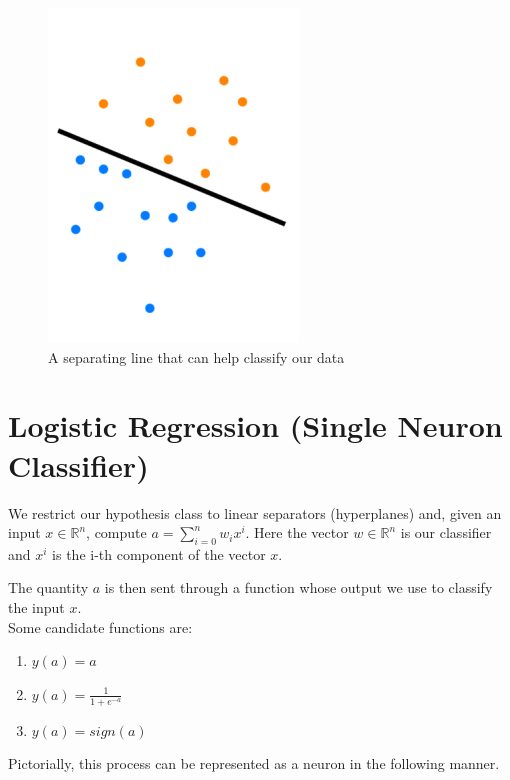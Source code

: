 \documentclass{article}%
\begin{document}
\begin{figure}[H]
	\centering
		\includegraphics[scale=0.37]{Classified.png}
   	\caption{A separating line that can help classify our data}
\end{figure}

\pagebreak
\section{Logistic Regression (Single Neuron Classifier)}
We restrict our hypothesis class to linear separators (hyperplanes) and, given an input $x \in \mathbb{R}^n$, compute $a = \sum_{i=0}^{n}w_ix^i$.
Here the vector $w \in \mathbb{R}^n$ is our classifier and $x^i$ is the i-th component of the vector $x$.


The quantity $a$ is then sent through a function whose output we use to classify the input $x$.
\\
Some candidate functions are:
\begin{enumerate}
\item $y(a) = a$
\item $y(a) = \frac{1}{1+e^{-a}}$
\item $y(a) = sign(a)$
\end{enumerate}

Pictorially, this process can be represented as a neuron in the following manner.
\end{document}
